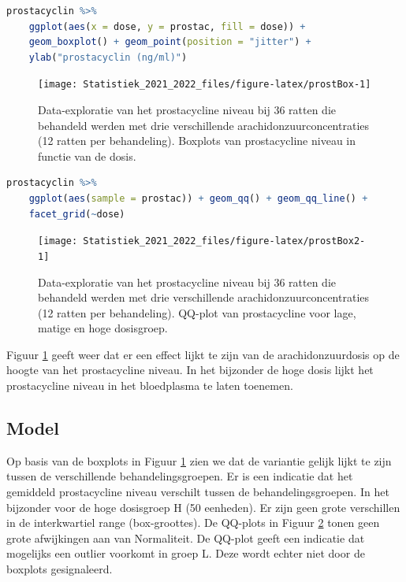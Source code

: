 \documentclass[
  12pt,dutch,coursenotes]{book}
\theoremstyle{definition}
\theoremstyle{definition}
\theoremstyle{definition}
\theoremstyle{definition}
\theoremstyle{remark}
\begin{document}
\begin{lstlisting}[language=R]
prostacyclin %>%
    ggplot(aes(x = dose, y = prostac, fill = dose)) +
    geom_boxplot() + geom_point(position = "jitter") +
    ylab("prostacyclin (ng/ml)")
\end{lstlisting}

\begin{figure}

{\centering \texttt{[image: Statistiek\_2021\_2022\_files/figure-latex/prostBox-1]} 

}

\caption{Data-exploratie van het prostacycline niveau bij 36 ratten die behandeld werden met drie verschillende arachidonzuurconcentraties (12 ratten per behandeling). Boxplots van prostacycline niveau in functie van de dosis.}\label{fig:prostBox}
\end{figure}

\begin{lstlisting}[language=R]
prostacyclin %>%
    ggplot(aes(sample = prostac)) + geom_qq() + geom_qq_line() +
    facet_grid(~dose)
\end{lstlisting}

\begin{figure}

{\centering \texttt{[image: Statistiek\_2021\_2022\_files/figure-latex/prostBox2-1]} 

}

\caption{Data-exploratie van het prostacycline niveau bij 36 ratten die behandeld werden met drie verschillende arachidonzuurconcentraties (12 ratten per behandeling). QQ-plot van prostacycline voor lage, matige en hoge dosisgroep.}\label{fig:prostBox2}
\end{figure}

Figuur \ref{fig:prostBox} geeft weer dat er een effect lijkt te zijn van de arachidonzuurdosis op de hoogte van het prostacycline niveau.
In het bijzonder de hoge dosis lijkt het prostacycline niveau in het bloedplasma te laten toenemen.

\hypertarget{model-1}{%
\subsection{Model}\label{model-1}}

Op basis van de boxplots in Figuur \ref{fig:prostBox} zien we dat de variantie gelijk lijkt te zijn tussen de verschillende behandelingsgroepen.
Er is een indicatie dat het gemiddeld prostacycline niveau verschilt tussen de behandelingsgroepen.
In het bijzonder voor de hoge dosisgroep H (50 eenheden).
Er zijn geen grote verschillen in de interkwartiel range (box-groottes).
De QQ-plots in Figuur \ref{fig:prostBox2} tonen geen grote afwijkingen aan van Normaliteit.
De QQ-plot geeft een indicatie dat mogelijks een outlier voorkomt in groep L.
Deze wordt echter niet door de boxplots gesignaleerd.
\end{document}
